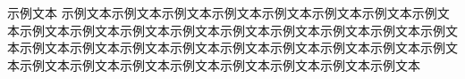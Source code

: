 \documentclass[twoside]{ctexart}
\begin{document}
\newpage 示例文本 \newpage 示例文本\newpage 示例文本\newpage 示例文本\newpage 示例文本\newpage 示例文本\newpage 示例文本\newpage 示例文本\newpage 示例文本\newpage 示例文本\newpage 示例文本\newpage 示例文本\newpage 示例文本\newpage 示例文本\newpage 示例文本\newpage 示例文本\newpage 示例文本\newpage 示例文本\newpage 示例文本\newpage 示例文本\newpage 示例文本\newpage 示例文本\newpage 示例文本\newpage 示例文本\newpage 示例文本\newpage 示例文本\newpage 示例文本\newpage 示例文本\newpage 示例文本\newpage 示例文本\newpage 示例文本\newpage 示例文本\newpage 示例文本\newpage 示例文本\newpage 示例文本
\end{document}
